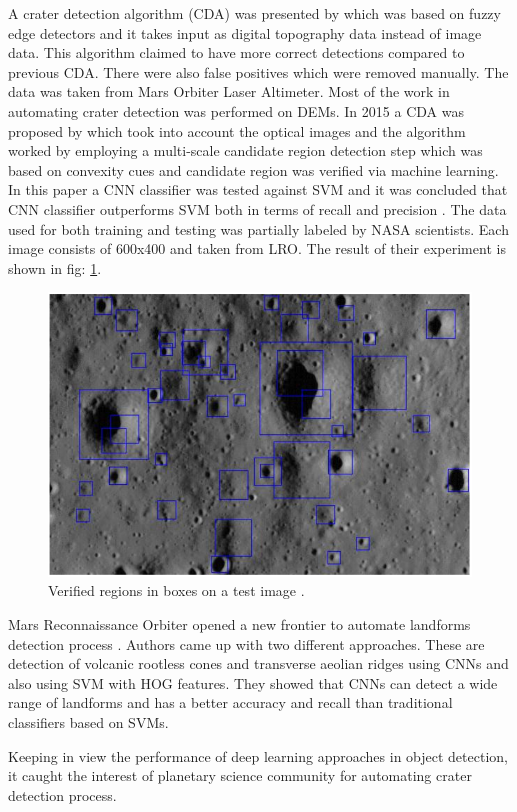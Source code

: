 \documentclass[11pt]{article}
\begin{document}
A crater detection algorithm (CDA) was presented by \cite{salamuniccar2010method} which was based on fuzzy edge detectors and it takes input as digital topography data instead of image data. This algorithm claimed to have more correct detections compared to previous CDA. There were also false positives which were removed manually. The data was taken from Mars Orbiter Laser Altimeter. Most of the work in automating crater detection was performed on DEMs. In 2015 a CDA was proposed by \cite{emami2015automatic} which took into account the optical images and the algorithm worked by employing a multi-scale candidate region detection step which was based on convexity cues and candidate region was verified via machine learning. In this paper a CNN classifier was tested against SVM and it was concluded that CNN classifier outperforms SVM both in terms of recall and precision \cite{emami2015automatic}. The data used for both training and testing was partially labeled by NASA scientists. Each image consists of 600x400 and taken from LRO. The result of their experiment is shown in fig: \ref{cnn_class}.

\begin{figure}[ht!]
	\centering
	\includegraphics[width=.6\textwidth]{files/literature/emami.png}
	\caption{Verified regions in boxes on a test image \cite{wetzler2005learning}.}
	\label{cnn_class}
\end{figure}

Mars Reconnaissance Orbiter opened a new frontier to automate landforms detection process \cite{palafox2017automated}. Authors came up with two different approaches. These are detection of volcanic rootless cones and transverse aeolian ridges using CNNs and also using SVM with HOG features. They showed that CNNs can detect a wide range of landforms and has a better accuracy and recall than traditional classifiers based on SVMs.

Keeping in view the performance of deep learning approaches in object detection, it caught the interest of planetary science community for automating crater detection process.
\end{document}
